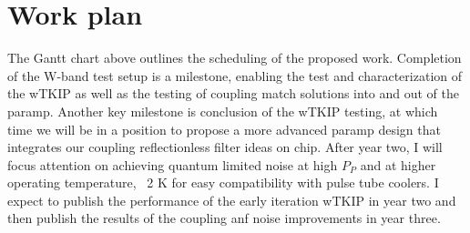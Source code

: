 \section*{Work plan}
The Gantt chart above outlines the scheduling of the proposed work. Completion of the
W-band test setup is a milestone, enabling the test and characterization of the wTKIP as well as the testing of coupling match solutions into and out of the paramp.
Another key milestone is conclusion of the wTKIP testing, at which time we will
be in a position to propose a more advanced paramp design that integrates our coupling
reflectionless filter ideas on chip. After year two, I will focus attention on achieving quantum limited noise at high $P_P$ and at higher operating temperature, ~2 K for easy compatibility with pulse tube coolers. 
I expect to publish the performance of the early iteration wTKIP in year two and then publish the results of the coupling anf noise improvements in year three.







%



